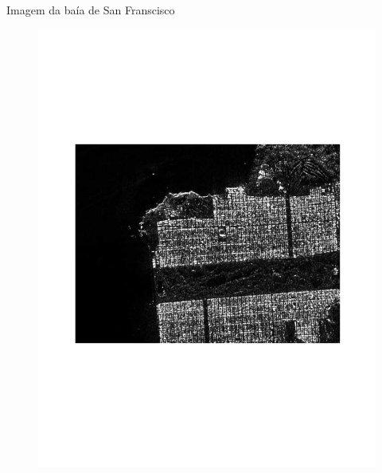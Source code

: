 \documentclass[10pt]{beamer}
\begin{document}

\begin{frame}{Imagem da baía de San Franscisco}
	\begin{figure}[hbt]
  \includegraphics[width=\linewidth]{sf_hh.pdf}
\endminipage
{}

\end{figure}
\end{frame}
\end{document}
